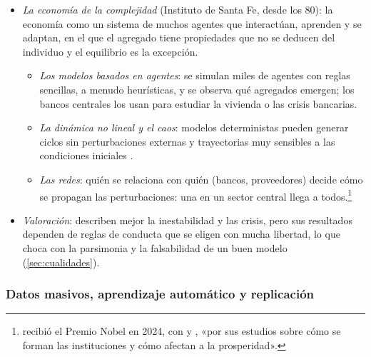 \documentclass[11pt]{article}
\begin{document}
\begin{itemize}
\item \emph{La economía de la complejidad} (Instituto de Santa Fe, desde los 80): la economía como un sistema de muchos agentes que interactúan, aprenden y se adaptan, en el que el agregado tiene propiedades que no se deducen del individuo y el equilibrio es la excepción\nocite{Arthur1999Complexity}.
  \begin{itemize}
  \item \emph{Los modelos basados en agentes}: se simulan miles de agentes con reglas sencillas, a menudo heurísticas, y se observa qué agregados emergen; los bancos centrales los usan para estudiar la vivienda o las crisis bancarias\nocite{HaldaneTurrell2018Interdisciplinary}.
  \item \emph{La dinámica no lineal y el caos}: modelos deterministas pueden generar ciclos sin perturbaciones externas y trayectorias muy sensibles a las condiciones iniciales\nocite{Grandmont1985Endogenous} .
  \item \emph{Las redes}: quién se relaciona con quién (bancos, proveedores) decide cómo se propagan las perturbaciones: una en un sector central llega a todos\nocite{AcemogluEtAl2012Network}.\footnote{ recibió el Premio Nobel en 2024, con  y , «por sus estudios sobre cómo se forman las instituciones y cómo afectan a la prosperidad»\nocite{NobelPrize2024}.}
  \end{itemize}
\item \emph{Valoración}: describen mejor la inestabilidad y las crisis, pero sus resultados dependen de reglas de conducta que se eligen con mucha libertad, lo que choca con la parsimonia y la falsabilidad de un buen modelo (\ref{sec:cualidades}).
\end{itemize}

\subsubsection{Datos masivos, aprendizaje automático y replicación}\label{sec:datos-masivos}
\end{document}
